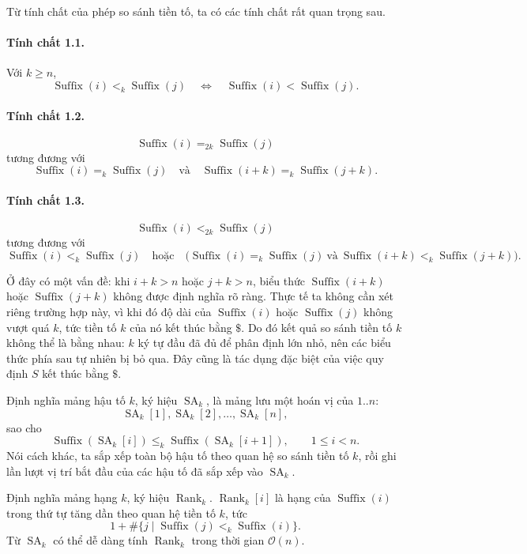 \documentclass[11pt]{article}
\newcommand{\Oh}{\mathcal{O}}
\newcommand{\SA}{\operatorname{SA}}
\newcommand{\Rank}{\operatorname{Rank}}
\newcommand{\Suf}{\operatorname{Suffix}}
\begin{document}
Từ tính chất của phép so sánh tiền tố, ta có các tính chất rất quan trọng
sau.

\paragraph{Tính chất 1.1.}
Với \(k\ge n\),
\[
  \Suf(i) <_k \Suf(j)
  \quad\Longleftrightarrow\quad
  \Suf(i)<\Suf(j).
\]

\paragraph{Tính chất 1.2.}
\[
  \Suf(i) =_{2k} \Suf(j)
\]
tương đương với
\[
  \Suf(i) =_k \Suf(j)
  \quad\text{và}\quad
  \Suf(i+k)=_k \Suf(j+k).
\]

\paragraph{Tính chất 1.3.}
\[
  \Suf(i) <_{2k} \Suf(j)
\]
tương đương với
\[
  \Suf(i)<_k\Suf(j)
  \quad\text{hoặc}\quad
  \bigl(\Suf(i)=_k\Suf(j)\ \text{và}\ \Suf(i+k)<_k\Suf(j+k)\bigr).
\]

Ở đây có một vấn đề: khi \(i+k>n\) hoặc \(j+k>n\), biểu thức
\(\Suf(i+k)\) hoặc \(\Suf(j+k)\) không được định nghĩa rõ ràng. Thực tế ta
không cần xét riêng trường hợp này, vì khi đó độ dài của \(\Suf(i)\) hoặc
\(\Suf(j)\) không vượt quá \(k\), tức tiền tố \(k\) của nó kết thúc bằng
\(\texttt{\$}\). Do đó kết quả so sánh tiền tố \(k\) không thể là bằng nhau:
\(k\) ký tự đầu đã đủ để phân định lớn nhỏ, nên các biểu thức phía sau tự
nhiên bị bỏ qua. Đây cũng là tác dụng đặc biệt của việc quy định \(S\) kết
thúc bằng \(\texttt{\$}\).

Định nghĩa mảng hậu tố \(k\), ký hiệu \(\SA_k\), là mảng lưu một hoán vị của
\(1..n\):
\[
  \SA_k[1],\SA_k[2],\ldots,\SA_k[n],
\]
sao cho
\[
  \Suf(\SA_k[i]) \le_k \Suf(\SA_k[i+1]),\qquad 1\le i<n.
\]
Nói cách khác, ta sắp xếp toàn bộ hậu tố theo quan hệ so sánh tiền tố \(k\),
rồi ghi lần lượt vị trí bắt đầu của các hậu tố đã sắp xếp vào \(\SA_k\).

Định nghĩa mảng hạng \(k\), ký hiệu \(\Rank_k\). \(\Rank_k[i]\) là hạng của
\(\Suf(i)\) trong thứ tự tăng dần theo quan hệ tiền tố \(k\), tức
\[
  1+\#\{j\mid \Suf(j)<_k \Suf(i)\}.
\]
Từ \(\SA_k\) có thể dễ dàng tính \(\Rank_k\) trong thời gian \(\Oh(n)\).
\end{document}
